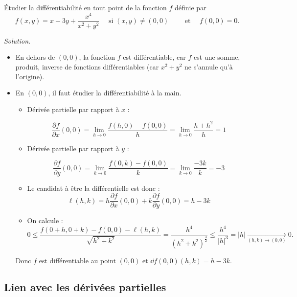 \begin{exemple}{}{}
	\'Etudier la différentiabilité en tout point de la fonction $f$ définie par
	$$f(x,y)= x-3y + \frac{x^4}{x^2+y^2}\quad\mbox{ si }(x,y)\neq (0,0)\qquad \text{ et }\quad f(0,0)=0.$$
	
	
	\bigskip
	\emph{Solution.}
	
	\begin{itemize}
		\item En dehors de $(0,0)$, la fonction $f$ est différentiable, car $f$ est une somme, produit, inverse de fonctions différentiables (car $x^2+y^2$ ne s'annule qu'à l'origine).
		
		\item En $(0,0)$, il faut étudier la différentiabilité à la main.
		\begin{itemize}
			\item Dérivée partielle par rapport à $x$ :
			
			$$\frac{\partial f}{\partial x}(0,0) = \lim _{h\to 0}\frac{f(h,0)-f(0,0)}{h}=\lim _{h\to 0}\frac{h+h^2}{h}=1$$
			
			
			\item Dérivée partielle par rapport à $y$ :
			
			$$\frac{\partial f}{\partial y}(0,0) = \lim _{k\to 0}\frac{f(0,k)-f(0,0)}{k}=\lim_{k\to 0}\frac{-3k}{k}=-3$$
			
			\item Le candidat à être la différentielle est donc :
			$$\ell(h,k) = 
			h \frac{\partial f}{\partial x}(0,0) + 
			k \frac{\partial f}{\partial y}(0,0)
			= h-3k$$
			
			\item On calcule :
			$$0 \le \frac{f(0+h,0+k) - f(0,0) - \ell(h,k)}{\sqrt{h^2+k^2}}
			=  \frac{h^4}{(h^2+k^2)^{\frac{3}{2}}}
			\le \frac{h^4}{|h|^3}
			=|h|
			\xrightarrow[(h,k)\to(0,0)]{} 0
			.$$    
			
		\end{itemize}
		
		Donc $f$ est différentiable au point $(0,0)$ et $\dd f (0,0)(h,k) = h-3k$.
		
	\end{itemize}
	
\end{exemple}

\subsection{Lien avec les dérivées partielles}


